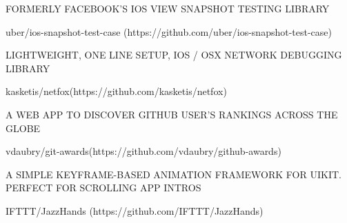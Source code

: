 

\begin{cventries}
	
	\cventry
	{\begin{cvitems} %
			\item{FORMERLY FACEBOOK’S IOS VIEW SNAPSHOT TESTING LIBRARY}
	\end{cvitems}} %
	{uber/ios-snapshot-test-case (https://github.com/uber/ios-snapshot-test-case) } %
	{} %
	{} %
	{}	

	\cventry
{\begin{cvitems} %
		\item{LIGHTWEIGHT, ONE LINE SETUP, IOS / OSX NETWORK DEBUGGING LIBRARY}
\end{cvitems}} %
{kasketis/netfox(https://github.com/kasketis/netfox) } %
{} %
{} %
{}	

	\cventry
{\begin{cvitems} %
		\item{A WEB APP TO DISCOVER GITHUB USER’S RANKINGS ACROSS THE GLOBE}
\end{cvitems}} %
{vdaubry/git-awards(https://github.com/vdaubry/github-awards) } %
{} %
{} %
{}	

	\cventry
{\begin{cvitems} %
		\item{A SIMPLE KEYFRAME-BASED ANIMATION FRAMEWORK FOR UIKIT. PERFECT FOR SCROLLING APP INTROS}
\end{cvitems}} %
{IFTTT/JazzHands (https://github.com/IFTTT/JazzHands) } %
{} %
{} %
{}	
\end{cventries}
